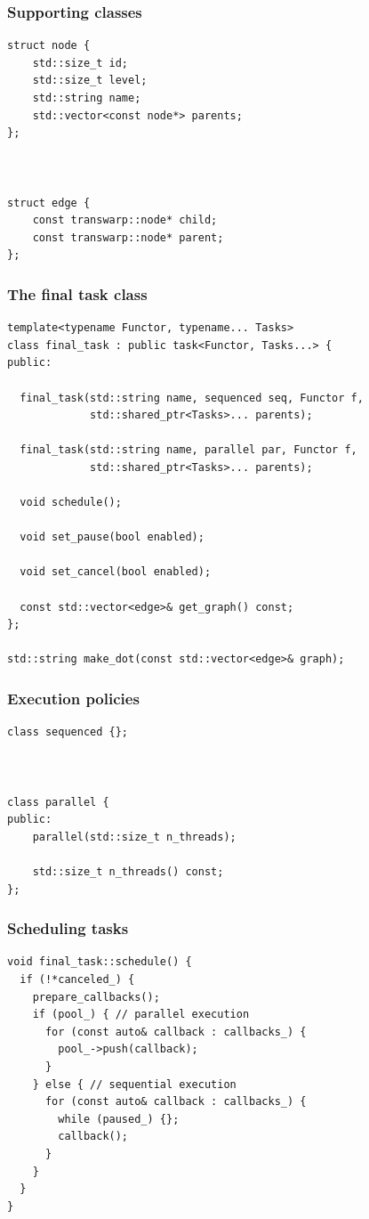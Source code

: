 \documentclass[11pt]{beamer}
\begin{document}
\begin{frame}[fragile]
\frametitle{Supporting classes}

\begin{lstlisting}
struct node {
    std::size_t id;
    std::size_t level;
    std::string name;
    std::vector<const node*> parents;
};



struct edge {
    const transwarp::node* child;
    const transwarp::node* parent;
};
\end{lstlisting}

\end{frame}


\begin{frame}[fragile]
\frametitle{The final task class}

\begin{lstlisting}
template<typename Functor, typename... Tasks>
class final_task : public task<Functor, Tasks...> {
public:

  final_task(std::string name, sequenced seq, Functor f, 
             std::shared_ptr<Tasks>... parents);

  final_task(std::string name, parallel par, Functor f, 
             std::shared_ptr<Tasks>... parents);

  void schedule();

  void set_pause(bool enabled);

  void set_cancel(bool enabled);

  const std::vector<edge>& get_graph() const;
};

std::string make_dot(const std::vector<edge>& graph);
\end{lstlisting}

\end{frame}


\begin{frame}[fragile]
\frametitle{Execution policies}
\begin{lstlisting}
class sequenced {};



class parallel {
public:
    parallel(std::size_t n_threads);

    std::size_t n_threads() const;
};
\end{lstlisting}
\end{frame}


\begin{frame}[fragile]
\frametitle{Scheduling tasks}
\begin{lstlisting}
void final_task::schedule() {
  if (!*canceled_) {
    prepare_callbacks();
    if (pool_) { // parallel execution
      for (const auto& callback : callbacks_) {
        pool_->push(callback);
      }
    } else { // sequential execution
      for (const auto& callback : callbacks_) {
        while (paused_) {};
        callback();
      }
    }
  }
}
\end{lstlisting}
\end{frame}
\end{document}
